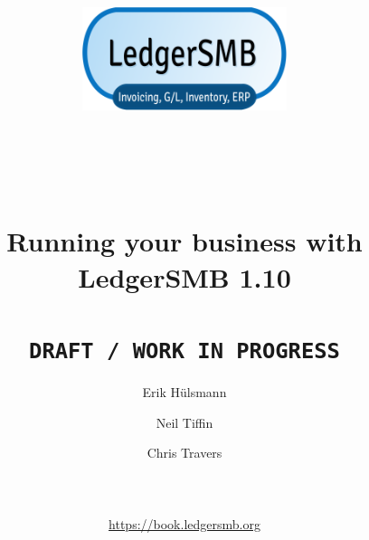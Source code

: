 \documentclass[10pt,a4paper]{book}
\newcommand{\ledgerSMBversion}{1.10 }
\begin{document}
\author{Erik H\"ulsmann \and Neil Tiffin \and Chris Travers \\
~ \\
~ \\
~ \\
 \url{https://book.ledgersmb.org}
} 

\title{
\includegraphics[width=0.45\textwidth]{NewLedgerSMBLogo512x256.png}\\
        ~ \\
        ~ \\
        ~ \\
        Running your business with\\
        {\Huge LedgerSMB \ledgerSMBversion} \\
        ~ \\
        \texttt{DRAFT / WORK IN PROGRESS} \\
}
\maketitle

%       
%       
%       
\end{document}
